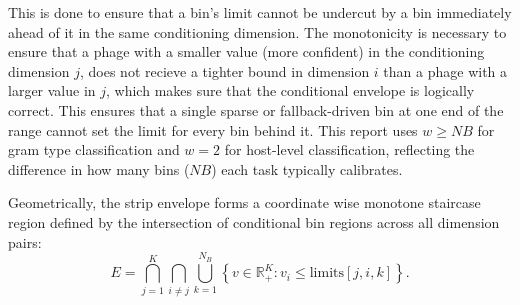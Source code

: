 This is done to ensure that a bin's limit cannot be undercut by a bin immediately ahead of it in the same conditioning 
dimension. The monotonicity is necessary to ensure that a phage with a smaller value (more confident) in the conditioning 
dimension $j$, does not recieve a tighter bound in dimension $i$ than a phage with a larger value in $j$, which makes sure that 
the conditional envelope is logically correct. This ensures that a single sparse or fallback-driven bin at one end of the range 
cannot set the limit for every bin behind it. This report uses $w \ge NB$ for gram type classification and $w=2$ for host-level 
classification, reflecting the difference in how many bins ($NB$) each task typically calibrates.

Geometrically, the strip envelope forms a coordinate wise monotone staircase region defined by the intersection of 
conditional bin regions across all dimension pairs:
\begin{equation}
E = \bigcap_{j=1}^K \bigcap_{i \ne j} \bigcup_{k=1}^{N_B} \left\{ v \in \mathbb{R}_+^K : v_i \le \text{limits}[j, i, k] \right\}.
\end{equation}





